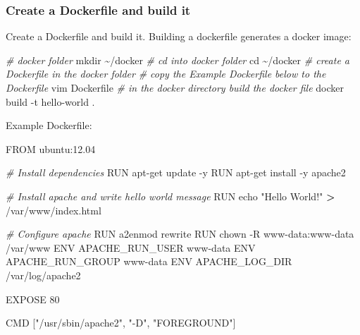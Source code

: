 \documentclass[
]{book}
\newenvironment{Shaded}{\begin{snugshade}}{\end{snugshade}}
\newcommand{\BuiltInTok}[1]{#1}
\newcommand{\CommentTok}[1]{\textcolor[rgb]{0.56,0.35,0.01}{\textit{#1}}}
\newcommand{\ExtensionTok}[1]{#1}
\newcommand{\FunctionTok}[1]{\textcolor[rgb]{0.00,0.00,0.00}{#1}}
\newcommand{\NormalTok}[1]{#1}
\newcommand{\OperatorTok}[1]{\textcolor[rgb]{0.81,0.36,0.00}{\textbf{#1}}}
\newcommand{\StringTok}[1]{\textcolor[rgb]{0.31,0.60,0.02}{#1}}
\begin{document}
\hypertarget{create-a-dockerfile-and-build-it}{%
\subsubsection{Create a Dockerfile and build it}\label{create-a-dockerfile-and-build-it}}

Create a Dockerfile and build it. Building a dockerfile generates a docker image:

\begin{Shaded}
\begin{Highlighting}[]
\CommentTok{\# docker folder}
\FunctionTok{mkdir}\NormalTok{ \textasciitilde{}/docker}
\CommentTok{\# cd into docker folder}
\BuiltInTok{cd}\NormalTok{ \textasciitilde{}/docker}
\CommentTok{\# create a Dockerfile in the docker folder}
\CommentTok{\# copy the Example Dockerfile below to the Dockerfile}
\ExtensionTok{vim}\NormalTok{ Dockerfile}
\CommentTok{\# in the docker directory build the docker file}
\ExtensionTok{docker}\NormalTok{ build {-}t hello{-}world .}
\end{Highlighting}
\end{Shaded}

Example Dockerfile:

\begin{Shaded}
\begin{Highlighting}[]
\ExtensionTok{FROM}\NormalTok{ ubuntu:12.04}

\CommentTok{\# Install dependencies}
\ExtensionTok{RUN}\NormalTok{ apt{-}get update {-}y}
\ExtensionTok{RUN}\NormalTok{ apt{-}get install {-}y apache2}

\CommentTok{\# Install apache and write hello world message}
\ExtensionTok{RUN}\NormalTok{ echo }\StringTok{"Hello World!"} \OperatorTok{\textgreater{}}\NormalTok{ /var/www/index.html}

\CommentTok{\# Configure apache}
\ExtensionTok{RUN}\NormalTok{ a2enmod rewrite}
\ExtensionTok{RUN}\NormalTok{ chown {-}R www{-}data:www{-}data /var/www}
\ExtensionTok{ENV}\NormalTok{ APACHE\_RUN\_USER www{-}data}
\ExtensionTok{ENV}\NormalTok{ APACHE\_RUN\_GROUP www{-}data}
\ExtensionTok{ENV}\NormalTok{ APACHE\_LOG\_DIR /var/log/apache2}

\ExtensionTok{EXPOSE}\NormalTok{ 80}

\ExtensionTok{CMD}\NormalTok{ [}\StringTok{"/usr/sbin/apache2"}\NormalTok{, }\StringTok{"{-}D"}\NormalTok{,  }\StringTok{"FOREGROUND"}\NormalTok{]}
\end{Highlighting}
\end{Shaded}
\end{document}
